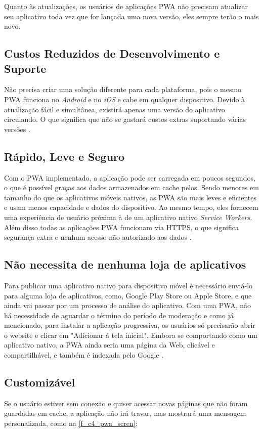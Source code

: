 Quanto às atualizações, os usuários de aplicações \ac{PWA} não precisam atualizar seu aplicativo toda vez que for lançada uma nova versão, eles sempre terão o mais novo.

\subsection{Custos Reduzidos de Desenvolvimento e Suporte}
Não precisa criar uma solução diferente para cada plataforma, pois o mesmo \ac{PWA} funciona no \textit{Android} e no \textit{iOS} e cabe em qualquer dispositivo. Devido à atualização fácil e simultânea, existirá apenas uma versão do aplicativo circulando. O que significa que não se gastará custos extras suportando várias versões \cite{pwabenefits}.

\subsection{Rápido, Leve e Seguro}
Com o \ac{PWA} implementado, a aplicação pode ser carregada em poucos segundos, o que é possível graças aos dados armazenados em cache pelos. Sendo menores em tamanho do que os aplicativos móveis nativos, as \ac{PWA} são mais leves e eficientes e usam menos capacidade e dados do dispositivo. Ao mesmo tempo, eles fornecem uma experiência de usuário próxima à de um aplicativo nativo \textit{Service Workers}. Além disso todas as aplicações \ac{PWA} funcionam via HTTPS, o que significa segurança extra e nenhum acesso não autorizado aos dados \cite{pwa2}.

\subsection{Não necessita de nenhuma loja de aplicativos}
Para publicar uma aplicativo nativo para dispositivo móvel é necessário enviá-lo para alguma loja de aplicativos, como, Google Play Store ou Apple Store, e que ainda vai passar por um processo de análise do aplicativo. Com uma \ac{PWA}, não há necessidade de aguardar o término do período de moderação e como já mencionado, para instalar a aplicação progressiva, os usuários só precisarão abrir o website e clicar em "Adicionar à tela inicial". Embora se comportando como um aplicativo nativo, a \ac{PWA} ainda seria uma página da Web, clicável e compartilhável, e também é indexada pelo Google \cite{pwabenefits}.

\subsection{Customizável}
Se o usuário estiver sem conexão e quiser acessar novas páginas que não foram guardadas em cache, a aplicação não irá travar, mas mostrará uma mensagem personalizada, como na \autoref{f_c4_pwa_scren}:

